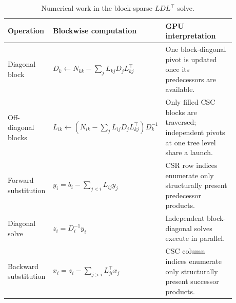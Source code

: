 \documentclass{article}
\theoremstyle{plain}
\theoremstyle{definition}
\begin{document}
\begin{table}[t]
\centering
\caption{Numerical work in the block-sparse $LDL^\top$ solve.}
\label{tab:sparse-direct-work}
\small
\begin{tabular}{p{0.20\linewidth}p{0.32\linewidth}p{0.36\linewidth}}
\toprule
Operation & Blockwise computation & GPU interpretation \\
\midrule
Diagonal block
  & $D_k\leftarrow N_{kk}-\sum_jL_{kj}D_jL_{kj}^{\top}$
  & One block-diagonal pivot is updated once its predecessors are available. \\
Off-diagonal blocks
  & $L_{ik}\leftarrow(N_{ik}-\sum_jL_{ij}D_jL_{kj}^{\top})D_k^{-1}$
  & Only filled CSC blocks are traversed; independent pivots at one tree level share a launch. \\
Forward substitution
  & $y_i=b_i-\sum_{j<i}L_{ij}y_j$
  & CSR row indices enumerate only structurally present predecessor products. \\
Diagonal solve
  & $z_i=D_i^{-1}y_i$
  & Independent block-diagonal solves execute in parallel. \\
Backward substitution
  & $x_i=z_i-\sum_{j>i}L_{ji}^{\top}x_j$
  & CSC column indices enumerate only structurally present successor products. \\
\bottomrule
\end{tabular}
\end{table}
\end{document}
